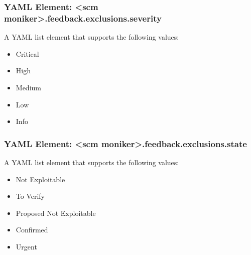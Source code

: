 \subsubsection{YAML Element: <scm moniker>.feedback.exclusions.severity}\label{sec:yaml-exclusions-severity}
A YAML list element that supports the following values:

\begin{itemize}
  \item Critical
  \item High
  \item Medium
  \item Low
  \item Info
\end{itemize}


\subsubsection{YAML Element: <scm moniker>.feedback.exclusions.state }\label{sec:yaml-exclusions-state}
A YAML list element that supports the following values:

\begin{itemize}
  \item Not Exploitable
  \item To Verify
  \item Proposed Not Exploitable
  \item Confirmed
  \item Urgent
\end{itemize}





